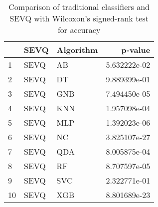 \begin{table}[H]
\footnotesize
\centering
\caption{Comparison of traditional classifiers and SEVQ with Wilcoxon’s signed-rank test for accuracy}
\label{tab:Traditional wilcoxon ACC comparison}
\begin{tabular}{lllr}
\hline
{} &  SEVQ & Algorithm &       p-value \\
\hline
1  &  SEVQ &        AB &  5.632222e-02 \\
2  &  SEVQ &        DT &  9.889399e-01 \\
3  &  SEVQ &       GNB &  7.494450e-05 \\
4  &  SEVQ &       KNN &  1.957098e-04 \\
5  &  SEVQ &       MLP &  1.392023e-06 \\
6  &  SEVQ &        NC &  3.825107e-27 \\
7  &  SEVQ &       QDA &  8.005875e-04 \\
8  &  SEVQ &        RF &  8.707597e-05 \\
9  &  SEVQ &       SVC &  2.322771e-01 \\
10 &  SEVQ &       XGB &  8.801689e-23 \\
\hline
\end{tabular}
\end{table}
